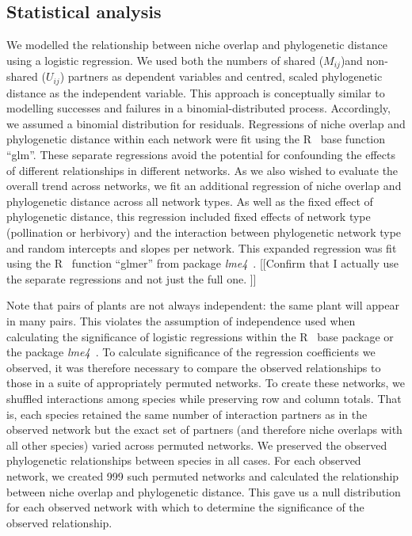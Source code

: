 \documentclass[12pt]{article}
\begin{document}
\begin{spacing}{1.5}


\subsection*{Statistical analysis} 

  We modelled the relationship between niche overlap and phylogenetic distance
  using a logistic regression. We used both the numbers of shared ($M_{ij}$)and 
  non-shared ($U_{ij}$) partners as dependent variables and centred, scaled phylogenetic 
  distance as the independent variable. This approach is conceptually similar to 
  modelling successes and failures in a binomial-distributed process. 
  Accordingly, we assumed a binomial distribution for residuals. Regressions of
  niche overlap and phylogenetic distance within each network were fit using the
  R~\citep{R} base function ``glm''. These separate regressions avoid the potential
  for confounding the effects of different relationships in different networks. As
  we also wished to evaluate the overall trend across networks, we fit an additional
  regression of niche overlap and phylogenetic distance across all network types.
  As well as the fixed effect of phylogenetic distance, this regression included 
  fixed effects of network type (pollination or herbivory) and the interaction 
  between phylogenetic network type and random intercepts and slopes per network.
  This expanded regression was fit using the R~\citep{R} function ``glmer'' from
  package \emph{lme4}~\citep{lme4}. [[Confirm that I actually use the separate 
  regressions and not just the full one. ]]


  Note that pairs of plants are not always independent: the same plant will
  appear in many pairs. This violates the assumption of independence used when 
  calculating the significance of logistic regressions within the R~\citep{R} 
  base package or the package \emph{lme4}~\citep{lme4}. To calculate significance 
  of the regression coefficients we observed, it was therefore necessary to compare the 
  observed relationships to those in a suite of appropriately permuted networks. To create 
  these networks, we shuffled interactions among species while preserving row 
  and column totals. That is, each species retained the same number of 
  interaction partners as in the observed network but the exact set of 
  partners (and therefore niche overlaps with all other species) varied across 
  permuted networks. We preserved the observed phylogenetic relationships 
  between species in all cases. For each observed network, we created 999 such 
  permuted networks and calculated the relationship between niche overlap and 
  phylogenetic distance. This gave us a null distribution for each observed 
  network with which to determine the significance of the observed 
  relationship.



\end{spacing}
\end{document}
